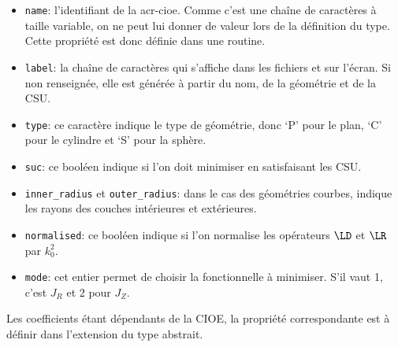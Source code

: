       \begin{itemize}
        \item \lstinline{name}: l'identifiant de la \gls{acr-cioe}. Comme c'est une chaîne de caractères à taille variable, on ne peut lui donner de valeur lors de la définition du type. Cette propriété est donc définie dans une routine.
        \item \lstinline{label}: la chaîne de caractères qui s'affiche dans les fichiers et sur l'écran. Si non renseignée, elle est générée à partir du nom, de la géométrie et de la CSU.
        \item \lstinline{type}: ce caractère indique le type de géométrie, donc `P' pour le plan, `C' pour le cylindre et `S' pour la sphère.
        \item \lstinline{suc}: ce booléen indique si l'on doit minimiser en satisfaisant les CSU.
        \item \lstinline{inner_radius} et \lstinline{outer_radius}: dans le cas des géométries courbes, indique les rayons des couches intérieures et extérieures.
        \item \lstinline{normalised}: ce booléen indique si l'on normalise les opérateurs \(\LD\) et \(\LR\) par \(k_0^2\).
        \item \lstinline{mode}: cet entier permet de choisir la fonctionnelle à minimiser. S'il vaut 1, c'est \(J_R\) et 2 pour \(J_Z\).
      \end{itemize}
      Les coefficients étant dépendants de la CIOE, la propriété correspondante est à définir dans l'extension du type abstrait.


